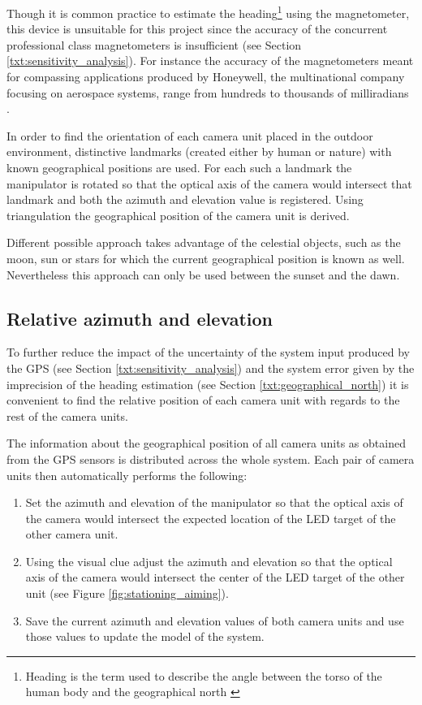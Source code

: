 Though it is common practice to estimate the heading\footnote{Heading is the term used to describe the angle between the torso of the human body and the geographical north \cite{Henriksson648760}} using the magnetometer, this device is unsuitable for this project since the accuracy of the concurrent professional class magnetometers is insufficient (see Section \ref{txt:sensitivity_analysis}). For instance the accuracy of the magnetometers meant for compassing applications produced by Honeywell, the multinational company focusing on aerospace systems, range from hundreds to thousands of milliradians \cite{Honeywell:compassing_catalog}.

In order to find the orientation of each camera unit placed in the outdoor environment, distinctive landmarks (created either by human or nature) with known geographical positions are used. For each such a landmark the manipulator is rotated so that the optical axis of the camera would intersect that landmark and both the azimuth and elevation value is registered. Using triangulation the geographical position of the camera unit is derived. 

Different possible approach takes advantage of the celestial objects, such as the moon, sun or stars for which the current geographical position is known as well. Nevertheless this approach can only be used between the sunset and the dawn.

\subsection{Relative azimuth and elevation}

To further reduce the impact of the uncertainty of the system input produced by the GPS (see Section \ref{txt:sensitivity_analysis}) and the system error given by the imprecision of the heading estimation (see Section \ref{txt:geographical_north}) it is convenient to find the relative position of each camera unit with regards to the rest of the camera units.

The information about the geographical position of all camera units as obtained from the GPS sensors is distributed across the whole system. Each pair of camera units then automatically performs the following:

\begin{enumerate}
	\item Set the azimuth and elevation of the manipulator so that the optical axis of the camera would intersect the expected location of the LED target of the other camera unit.
	\item Using the visual clue adjust the azimuth and elevation so that the optical axis of the camera would intersect the center of the LED target of the other unit (see Figure \ref{fig:stationing_aiming}).
	\item Save the current azimuth and elevation values of both camera units and use those values to update the model of the system.
\end{enumerate}

